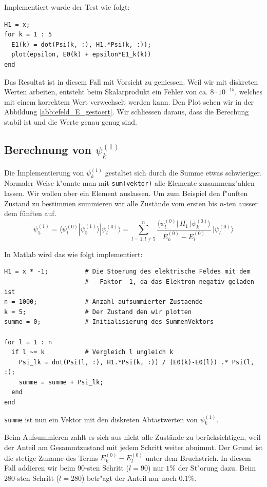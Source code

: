 \begin{refsection}
Implementiert wurde der Test wie folgt:
\begin{lstlisting}[style=Matlab]
H1 = x;
for k = 1 : 5
  E1(k) = dot(Psi(k, :), H1.*Psi(k, :));
  plot(epsilon, E0(k) + epsilon*E1_k(k))
end
\end{lstlisting}
Das Resultat ist in diesem Fall mit Vorsicht zu geniessen.
Weil wir mit diskreten Werten arbeiten, entsteht beim Skalarprodukt ein Fehler von ca. $8 \cdot 10^{-15}$,
welches mit einem korrektem Wert verwechselt werden kann.
Den Plot sehen wir in der Abbildung \ref{abb:efeld_E_gestoert}.
Wir schliessen daraus, dass die Berechung stabil ist und die Werte genau genug sind.





\subsection{Berechnung von $\psi_k^{(1)}$}

Die Implementierung von $\psi_k^{(1)}$ gestaltet sich durch die Summe etwas schwieriger.
Normaler Weise k"onnte man mit \verb|sum(vektor)| alle Elemente zusammenz"ahlen lassen.
Wir wollen aber ein Element auslassen. 
Um zum Beispiel den f"unften Zustand zu bestimmen summieren wir alle Zust\"ande vom 
ersten bis $n$-ten ausser dem f\"unften auf.
\begin{equation}
  \psi_5^{(1)} = \langle\psi_l^{(0)}|\psi_5^{(1)}\rangle|\psi_l^{(0)}\rangle = 
  \sum_{l=1 ; l\ne 5}^{n}
    \frac{\langle \psi_l^{(0)}|\, H_1 \,|\psi_k^{(0)}\rangle}{E_k^{(0)}-E_l^{(0)}}
        \,
    |\psi_l^{(0)}\rangle
\end{equation}

In Matlab wird das wie folgt implementiert:
\begin{lstlisting}[style=Matlab]
H1 = x * -1;          # Die Stoerung des elektrische Feldes mit dem
                      #   Faktor -1, da das Elektron negativ geladen ist
n = 1000;             # Anzahl aufsummierter Zustaende
k = 5;                # Der Zustand den wir plotten
summe = 0;            # Initialisierung des SummenVektors

for l = 1 : n
  if l ~= k           # Vergleich l ungleich k
    Psi_lk = dot(Psi(l, :), H1.*Psi(k, :)) / (E0(k)-E0(l)) .* Psi(l, :);
    summe = summe + Psi_lk;
  end
end
\end{lstlisting}
\verb|summe| ist nun ein Vektor mit den diskreten Abtastwerten von $\psi_k^{(1)}$.

Beim Aufsummieren zahlt es sich aus nicht alle Zust\"ande zu ber\"ucksichtigen, weil der Anteil am Gesammtzustand 
mit jedem Schritt weiter abnimmt. Der Grund ist die stetige Zuname des Terms 
$E^{(0)}_k-E^{(0)}_l$ unter dem Bruchstrich.
In diesem Fall addieren wir beim 90-sten Schritt ($l=90$) nur $1\%$ der St"orung dazu.
Beim 280-sten Schritt ($l=280$) betr"agt der Anteil nur noch $0.1\%$.


\end{refsection}
